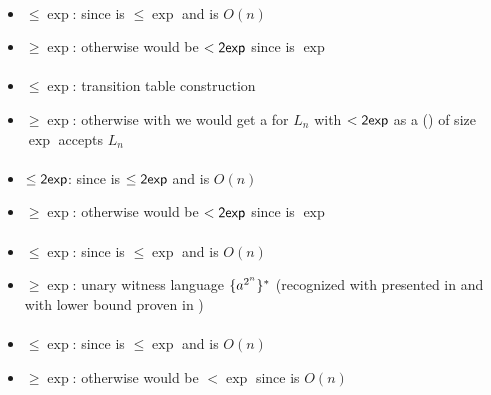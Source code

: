 \paragraph{\OLA{}\tto\TNFA}
\begin{itemize}
	\item $\le\exp$: since \hyperref[cost:1LAto1NFA]{\OLA{}\tto\ONFA} is $\le\exp$ and \ONFA{}\tto\TNFA is $O(n)$
	\item $\ge\exp$: otherwise \hyperref[cost:1LAto1DFA]{\OLA{}\tto\ODFA} would be $<\mathsf{2exp}$ since \TNFA{}\tto\ODFA is $\exp$
\end{itemize}
\paragraph{\ODLA{}\tto\ODFA}\label{cost:1DLAto1DFA}
\begin{itemize}
	\item $\le\exp$: transition table construction \cite{PigPis14}
	\item $\ge\exp$: otherwise with \hyperref[cost:1DLAto1DFA]{\ODLA{}\tto\ODFA} we would get a \ODFA for $L_n$ with $<\mathsf{2exp}$ as a \ODLA (\TDFA) of size $\exp$ accepts $L_n$ \cite{PigPis14}
\end{itemize}
\paragraph{\OLA{}\tto\ODLA}
\begin{itemize}
	\item $\le\mathsf{2exp}$: since \hyperref[cost:1LAto1DFA]{\OLA{}\tto\ODFA} is $\le\mathsf{2exp}$ and \ODFA{}\tto\ODLA is $O(n)$
	\item $\ge\exp$: otherwise \hyperref[cost:1LAto1DFA]{\OLA{}\tto\ODFA} would be $<\mathsf{2exp}$ since \ODLA{}\tto\ODFA is $\exp$
\end{itemize}
\paragraph{\ODLA{}\tto\TNFA}\label{cost:1DLAto2NFA}
\begin{itemize}
	\item $\le\exp$: since \hyperref[cost:1DLAto1DFA]{\ODLA{}\tto\ODFA} is $\le\exp$ and \ODFA{}\tto\TNFA is $O(n)$
	\item $\ge\exp$: unary witness language $\{a^{2^n}\}^*$ (recognized with \ODLA presented in \cite{PigPri19} and with \TNFA lower bound proven in \cite{MerPig00})
\end{itemize}
\paragraph{\ODLA{}\tto\ONFA}
\begin{itemize}
	\item $\le\exp$: since \hyperref[cost:1DLAto1DFA]{\ODLA{}\tto\ODFA} is $\le\exp$ and \ODFA{}\tto\ONFA is $O(n)$
	\item $\ge\exp$: otherwise \hyperref[cost:1DLAto2NFA]{\ODLA{}\tto\TNFA} would be $<\exp$ since \ONFA{}\tto\TNFA is $O(n)$
\end{itemize}
